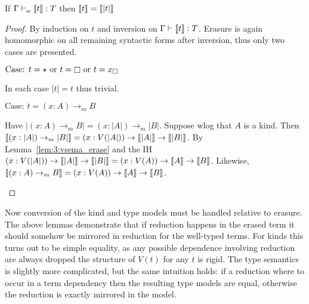 \begin{lemma}
    \label{lem:3:sema_erase}
    If $\Gamma \vdash_\omega \llbracket t \rrbracket : T$ then $\llbracket t \rrbracket = \llbracket |t| \rrbracket$
\end{lemma}
\begin{proof}
    By induction on $t$ and inversion on $\Gamma \vdash \llbracket t \rrbracket : T$.
    Erasure is again homomorphic on all remaining syntactic forms after inversion, thus only two cases are presented.

    $\text{Case: } t = \star \text{ or } t = \kind \text{ or } t = x_\square$
    \begin{proofcase}
        In each case $|t| = t$ thus trivial.
    \end{proofcase}

    $\text{Case: } t = (x : A) \to_m B$
    \begin{proofcase}
        Have $|(x : A) \to_m B| = (x : |A|) \to_m |B|$.
        Suppose wlog that $A$ is a kind.
        Then $\llbracket (x : |A|) \to_m |B| \rrbracket = (x : V(|A|)) \to \llbracket |A| \rrbracket \to \llbracket |B| \rrbracket$.
        By Lemma~\ref{lem:3:vsema_erase} and the IH $(x : V(|A|)) \to \llbracket |A| \rrbracket \to \llbracket |B| \rrbracket = (x : V(A)) \to \llbracket A \rrbracket \to \llbracket B \rrbracket$.
        Likewise, $\llbracket (x : A) \to_m B \rrbracket = (x : V(A)) \to \llbracket A \rrbracket \to \llbracket B \rrbracket$.
    \end{proofcase}
\end{proof}

Now conversion of the kind and type models must be handled relative to erasure.
The above lemmas demonstrate that if reduction happens in the erased term it should somehow be mirrored in reduction for the well-typed terms.
For kinds this turns out to be simple equality, as any possible dependence involving reduction are always dropped the structure of $V(t)$ for any $t$ is rigid.
The type semantics is slightly more complicated, but the same intuition holds: if a reduction where to occur in a term dependency then the resulting type models are equal, otherwise the reduction is exactly mirrored in the model.

